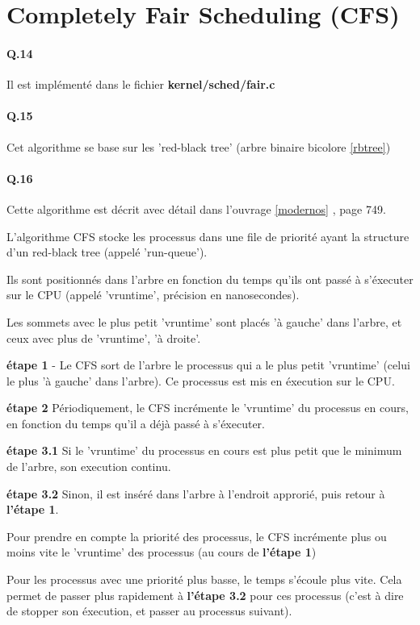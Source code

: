 \documentclass[10pt]{article}
\begin{document}
\newpage
\section{Completely Fair Scheduling (CFS)}\label{cfs}
  \paragraph{Q.14} Il est implémenté dans le fichier \textbf{kernel/sched/fair.c}

  \paragraph{Q.15} Cet algorithme se base sur les 'red-black tree' (arbre binaire bicolore \ref{rbtree})

  \paragraph{Q.16} Cette algorithme est décrit avec détail dans l'ouvrage \ref{modernos} , page 749.
  
  L'algorithme CFS stocke les processus dans une file de priorité ayant la structure d'un red-black tree (appelé 'run-queue').
  
  Ils sont positionnés dans l'arbre en fonction du temps qu'ils ont passé à s'éxecuter sur le CPU (appelé 'vruntime', précision en nanosecondes).
  
  Les sommets avec le plus petit 'vruntime' sont placés 'à gauche' dans l'arbre, et ceux avec plus de 'vruntime', 'à droite'.
  
  \textbf{étape 1} - Le CFS sort de l'arbre le processus qui a le plus petit 'vruntime' (celui le plus 'à gauche' dans l'arbre).
  Ce processus est mis en éxecution sur le CPU.

  \textbf{étape 2} Périodiquement, le CFS incrémente le 'vruntime' du processus en cours, en fonction du temps
  qu'il a déjà passé à s'éxecuter.
  
  \textbf{étape 3.1} Si le 'vruntime' du processus en cours est plus petit que le minimum de l'arbre, son execution continu.
  
  \textbf{étape 3.2} Sinon, il est inséré dans l'arbre à l'endroit approrié, puis retour à \textbf{l'étape 1}.
  
  Pour prendre en compte la priorité des processus, le CFS incrémente plus ou moins
  vite le 'vruntime' des processus (au cours de \textbf{l'étape 1})
  
  Pour les processus avec une priorité plus basse, le temps s'écoule plus vite.
  Cela permet de passer plus rapidement à \textbf{l'étape 3.2} pour ces processus (c'est à dire de stopper son éxecution, et passer au processus suivant).
  
\end{document}
